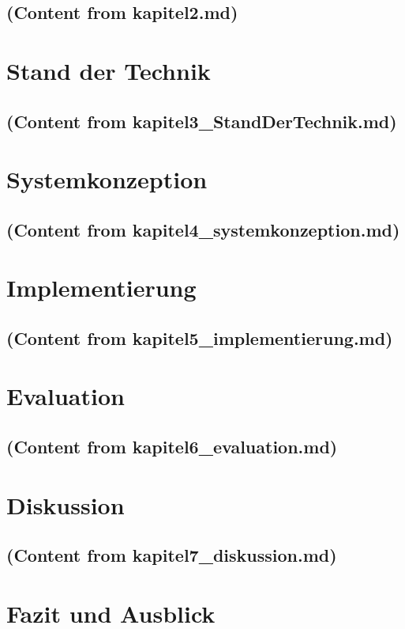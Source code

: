 \documentclass[12pt,a4paper,notitlepage,ngerman]{report}
\begin{document}
\section{(Content from kapitel2.md)}

\chapter{Stand der Technik}
\section{(Content from kapitel3\_StandDerTechnik.md)}

\chapter{Systemkonzeption}
\section{(Content from kapitel4\_systemkonzeption.md)}

\chapter{Implementierung}
\section{(Content from kapitel5\_implementierung.md)}

\chapter{Evaluation}
\section{(Content from kapitel6\_evaluation.md)}

\chapter{Diskussion}
\section{(Content from kapitel7\_diskussion.md)}

\chapter{Fazit und Ausblick}
\end{document}
